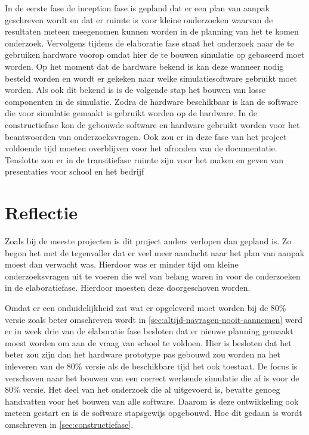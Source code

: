 \documentclass[a4paper, 11pt, oneside]{report}
\begin{document}
In de eerste fase de inception fase is gepland dat er een plan van aanpak geschreven wordt en dat er ruimte is voor kleine onderzoeken waarvan de resultaten meteen meegenomen kunnen worden in de planning van het te komen onderzoek.
Vervolgens tijdens de elaboratie fase staat het onderzoek naar de te gebruiken hardware voorop omdat hier de te bouwen simulatie op gebaseerd moet worden.    
Op het moment dat de hardware bekend is kan deze wanneer nodig besteld worden en wordt er gekeken naar welke simulatiesoftware gebruikt moet worden.
Als ook dit bekend is is de volgende stap het bouwen van losse componenten in de simulatie. 
Zodra de hardware beschikbaar is kan de software die voor simulatie gemaakt is gebruikt worden op de hardware.
In de constructiefase kon de gebouwde software en hardware gebruikt worden voor het beantwoorden van onderzoeksvragen. 
Ook zou er in deze fase van het project voldoende tijd moeten overblijven voor het afronden van de documentatie.
Tenslotte zou er in de transitiefase ruimte zijn voor het maken en geven van presentaties voor school en het bedrijf
 
\section{Reflectie}\label{sec:reflectie}

Zoals bij de meeste projecten is dit project anders verlopen dan gepland is. Zo begon het met de tegenvaller dat er veel meer aandacht naar het plan van aanpak moest dan verwacht was. Hierdoor was er minder tijd om kleine onderzoeksvragen uit te voeren die wel van belang waren in voor de onderzoeken in de elaboratiefase. Hierdoor moesten deze doorgeschoven worden.

Omdat er een onduidelijkheid zat wat er opgeleverd moet worden bij de 80\% versie zoals beter omschreven wordt in \autoref{sec:altijd-navragen-nooit-aannemen} werd er in week drie van de elaboratie fase besloten dat er nieuwe planning gemaakt moest worden om aan de vraag van school te voldoen. 
Hier is besloten dat het beter zou zijn dan het hardware prototype pas gebouwd zou worden na het inleveren van de 80\% versie als de beschikbare tijd het ook toestaat. 
De focus is verschoven naar het bouwen van een correct werkende simulatie die af is voor  de 80\% versie.
Het deel van het onderzoek die al uitgevoerd is, bevatte genoeg handvatten voor het bouwen van alle software. 
Daarom is deze ontwikkeling ook meteen gestart en is de software stapsgewijs opgebouwd. Hoe dit gedaan is wordt omschreven in \autoref{sec:constructiefase}. 
\end{document}

